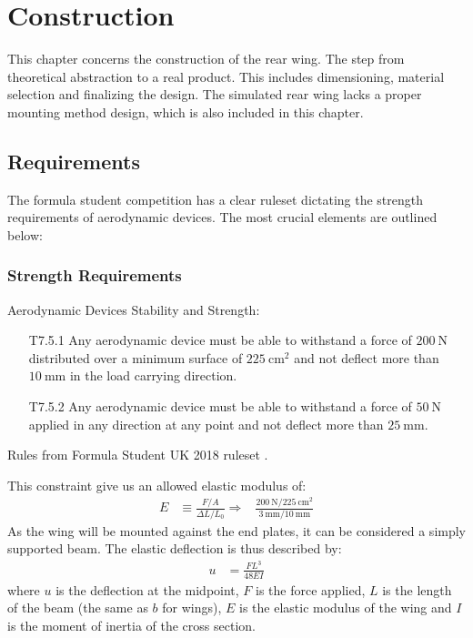 \chapter{Construction}

  This chapter concerns the construction of the rear wing. The step from theoretical abstraction to a real product. This includes dimensioning, material selection and finalizing the design. The simulated rear wing lacks a proper mounting method design, which is also included in this chapter.

\section{Requirements}

  The formula student competition has a clear ruleset dictating the strength requirements of aerodynamic devices. The most crucial elements are outlined below:

  \subsection{Strength Requirements}
    \begin{tcolorbox}[colframe=seapurple,colback=seapurple!1]
      Aerodynamic Devices Stability and Strength:
      \begin{itemize}
        \item [T7.5.1] Any aerodynamic device must be able to withstand a force of $\SI{200}{\newton}$ distributed over a minimum surface of $\SI{225}{\centi\metre\squared}$ and not deflect more than $\SI{10}{\milli\metre}$ in the load carrying direction.
        \item [T7.5.2] Any aerodynamic device must be able to withstand a force of $\SI{50}{\newton}$ applied in any direction at any point and not deflect more than $\SI{25}{\milli\metre}$.
      \end{itemize}

      \hspace*{\fill}\tiny{Rules from Formula Student UK 2018 ruleset \cite{FSrules18}.}
    \end{tcolorbox}

    This constraint give us an allowed elastic modulus of:
    \begin{align}
      E &\equiv \frac{F/A}{\Delta L/{L_0}}
      \Rightarrow&
      \frac{\SI{200}{\newton}
      /
      \SI{225}{\centi\metre\squared}}
      {\SI{3}{\milli\metre}/\SI{10}{\milli\metre}}
    \end{align}
    As the wing will be mounted against the end plates, it can be considered a simply supported beam. The elastic deflection is thus described by:
    \begin{align}
      u &= \frac{FL^3}{48EI}
    \end{align}
    where $u$ is the deflection at the midpoint, $F$ is the force applied, $L$ is the length of the beam (the same as $b$ for wings), $E$ is the elastic modulus of the wing and $I$ is the moment of inertia of the cross section.

